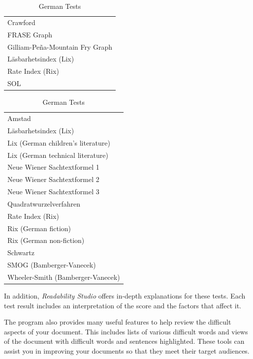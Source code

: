 \documentclass[
]{book}
\theoremstyle{definition}
\theoremstyle{definition}
\theoremstyle{definition}
\theoremstyle{definition}
\theoremstyle{remark}
\begin{document}
\begin{table}[!htb]
    \begin{minipage}{.5\linewidth}
      \caption{Spanish Tests}
\begin{tabular}[t]{>{}l}
\toprule
Crawford\\
FRASE Graph\\
Gilliam-Peña-Mountain Fry Graph\\
Läsbarhetsindex (Lix)\\
Rate Index (Rix)\\
SOL\\
\bottomrule
\end{tabular}\hspace{1cm}
    \end{minipage}%
    \hspace{.1cm}
    \begin{minipage}{.5\linewidth}
      \caption{German Tests}
\begin{tabular}[t]{>{}l}
\toprule
Amstad\\
Läsbarhetsindex (Lix)\\
Lix (German children’s literature)\\
Lix (German technical literature)\\
Neue Wiener Sachtextformel 1\\
Neue Wiener Sachtextformel 2\\
Neue Wiener Sachtextformel 3\\
Quadratwurzelverfahren\\
Rate Index (Rix)\\
Rix (German fiction)\\
Rix (German non-fiction)\\
Schwartz\\
SMOG (Bamberger-Vanecek)\\
Wheeler-Smith (Bamberger-Vanecek)\\
\bottomrule
\end{tabular}\end{minipage}
    \end{table}

In addition, \emph{Readability Studio} offers in-depth explanations for these tests. Each test result includes an interpretation of the score and the factors that affect it.

The program also provides many useful features to help review the difficult aspects of your document. This includes lists of various difficult words and views of the document with difficult words and sentences highlighted. These tools can assist you in improving your documents so that they meet their target audiences.
\end{document}

